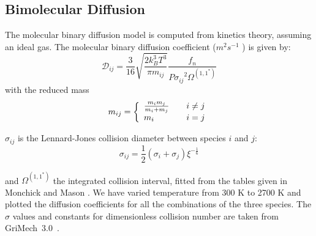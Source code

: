 \subsection{Bimolecular Diffusion}
 The molecular binary diffusion model is
computed from kinetics theory, assuming an ideal gas. The molecular binary diffusion\cite{Curtiss} coefficient ($m^2 s^{-1}$ ) is given by:
%
\begin{equation}
  \mathcal{D}_{ij} = \frac{3}{16}\sqrt{\frac{2 k_B^3 T^3}{\pi m_{ij}}}\frac{f_n}{{ P \sigma_{ij}}^2   \Omega^{(1,1^*)}}
\end{equation}
with  the reduced mass
\begin{equation}
m_{ij} = \left\{\begin{array}{l@{\qquad}l}
                \frac{m_i m_j}{m_i + m_j} &  i \neq j \\
                m_i                                  & i=j
                    \end{array}
              \right.
\end{equation}

$\sigma_{ij}$ is the Lennard-Jones collision diameter between species $i$ and $j$:
\begin{equation}
\sigma_{ij} = \frac{1}{2}\left(\sigma_i + \sigma_j\right) \xi^{-\frac{1}{6}}
\end{equation}

 and $\Omega^{(1,1^*)}$ the integrated collision interval,
fitted from the tables given in Monchick and Mason \cite{Monchick}. We
have varied temperature from 300 K to 2700 K and plotted the diffusion
coefficients for all the combinations of the three species.
The $\sigma$ values and constants for dimensionless collision number
are taken from GriMech~3.0~\cite{gri}.


